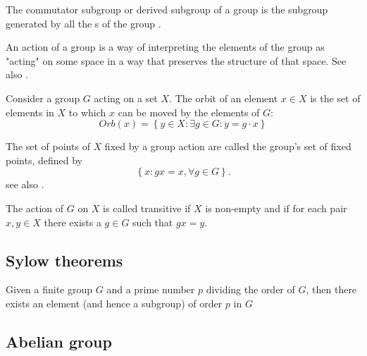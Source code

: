 \begin{appendices}
\begin{definition}
  The commutator subgroup or derived subgroup of a group is the
  subgroup generated by all the s of the group 
  \cite{wiki:commutatorsubgroup}.
  \label{def:commutatorsubgroup}
\end{definition}

\begin{definition}[Action]
  An action of a group is a way of
  interpreting the elements of the 
  group as "acting" on some space in a way that preserves the structure
  of that space. See also \cite{wiki:groupaction}.
  \label{def:action}
\end{definition}

\begin{definition}[Orbit]
  Consider \cite{wiki:groupaction} a group $G$ acting on a set
  $X$. The orbit of an element $x \in X$ 
  is the set of elements in $X$ to which $x$ can be moved by the elements
  of $G$:
  \[
  Orb\left(x\right) = \left\{y \in X: \exists g \in G: y = g \cdot x \right\}
  \]
  \label{def:orbit}
\end{definition}

\begin{definition}
  The set of points of $X$ fixed by a group action are called the
  group's set of fixed points, defined by
  \[
  \left\{
  x: g x = x, \forall g \in G
  \right\}.
  \]
  see also \cite{mathworld:groupfixedpoint}. 
  \label{def:fixedpoint}
\end{definition}

\begin{definition}
  The action of $G$ on $X$ is called \cite{wiki:groupaction}
  transitive if $X$ is non-empty and if for each pair $x, y \in X$ there
  exists a $g \in G$ such that $gx = y$.
  \label{def:transitive}
\end{definition}

\subsection{Sylow theorems}


\begin{corollary}[Sylow]
  Given a finite group $G$ and a prime number $p$ dividing the order of $G$,
  then there exists an element (and hence a subgroup) of order $p$ in
  $G$ \cite{wiki:sylow}
  \label{cor:sylow}
\end{corollary}

\subsection{Abelian group}


\end{appendices}
